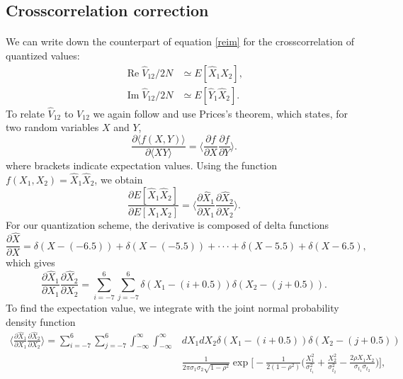 \documentclass[11pt]{article}
\renewcommand{\Re}{\operatorname{Re}}
\renewcommand{\Im}{\operatorname{Im}}
\begin{document}
\subsection{Crosscorrelation correction}\label{cross2}
\paragraph{}
We can write down the counterpart of equation \eqref{reim} for the crosscorrelation of quantized values:
\begin{equation}\label{qreim}
\begin{split}
\Re \hat V_{12}/2N&\simeq E[\hat X_{1} \hat X_{2}], \\
\Im \hat V_{12}/2N&\simeq E[\hat Y_{1}\hat X_{2}].
\end{split}
\end{equation}
To relate $\hat V_{12}$ to $V_{12}$ we again follow \cite{VV} and use Prices's theorem, which states, for two random variables $X$ and $Y$,
\begin{equation}
\frac{ \partial \langle f(X, Y)\rangle}{\partial \langle XY\rangle}=\Big\langle\frac{\partial f}{\partial X}\frac{\partial f}{\partial Y}\Big\rangle.
\end{equation}
where brackets indicate expectation values.
Using the function $f(X_1, X_2)=\hat X_1 \hat X_2$, we obtain
\begin{equation}\label{price}
\frac{\partial E[\hat X_1 \hat X_2]}{\partial E[X_1 X_2]}=\Big\langle\frac{\partial \hat X_1}{\partial X_1}\frac{\partial \hat X_2}{\partial X_2}\Big\rangle.
\end{equation}
For our quantization scheme, the derivative is composed of delta functions
\begin{equation}
\frac{\partial \hat X}{\partial X} = \delta(X -(-6.5)) +\delta(X -(-5.5))+\cdot\cdot\cdot+\delta(X-5.5)+\delta(X-6.5),
\end{equation}
which gives
\begin{equation}
\frac{\partial \hat X_1}{\partial X_1}\frac{\partial \hat X_2}{\partial X_2}=\sum_{i=-7}^{6}\sum_{j=-7}^{6}\delta(X_1-(i+0.5))\delta(X_2-(j+0.5)).
\end{equation}
To find the expectation value, we integrate with the joint normal probability density function
\begin{equation}
\begin{split}
\Big\langle\frac{\partial \hat X_1}{\partial X_1}\frac{\partial \hat X_2}{\partial X_2}\Big\rangle=\sum_{i=-7}^{6}\sum_{j=-7}^{6}\int_{-\infty}^\infty\int_{-\infty}^\infty &dX_1dX_2\delta(X_1-(i+0.5))\delta(X_2-(j+0.5))\\
&\frac{1}{2\pi\sigma_{1}\sigma_{2}\sqrt{1-\rho^2}}\exp\Big[-\frac{1}{2(1-\rho^2)}\Big(\frac{X_1^2}{\sigma_{t_1}^2}+\frac{X_2^2}{\sigma_{t_2}^2}-\frac{2\rho X_1X_2}{\sigma_{t_1}\sigma_{t_2}}\Big)\Big],
\end{split}
\end{equation}
\end{document}
